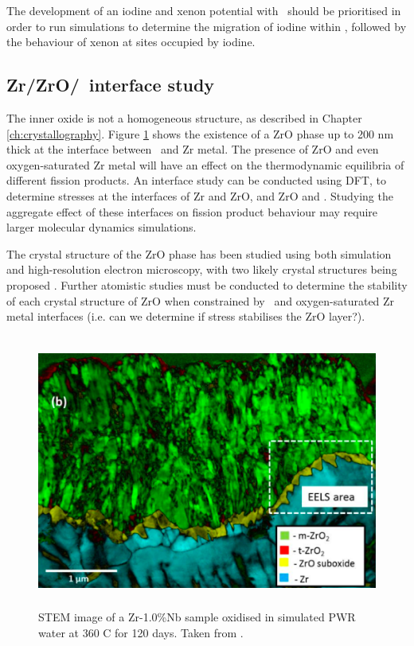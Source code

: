 The development of an iodine and xenon potential with \zirconia\ should be prioritised in order to run simulations to determine the migration of iodine within \zirconia, followed by the behaviour of xenon at sites occupied by iodine.

\subsection{Zr/ZrO/\zirconia\ interface study}

The inner oxide is not a homogeneous structure, as described in Chapter \ref{ch:crystallography}. Figure \ref{fig:zro_interface} shows the existence of a ZrO phase up to 200 nm thick at the interface between \zirconia\ and Zr metal. The presence of ZrO and even oxygen-saturated Zr metal will have an effect on the thermodynamic equilibria of different fission products. An interface study can be conducted using DFT, to determine stresses at the interfaces of Zr and ZrO, and ZrO and \zirconia . Studying the aggregate effect of these interfaces on fission product behaviour may require larger molecular dynamics simulations. 

The crystal structure of the ZrO phase has been studied using both simulation and high-resolution electron microscopy, with two likely crystal structures being proposed \cite{Nicholls2015}. Further atomistic studies must be conducted to determine the stability of each crystal structure of ZrO when constrained by \zirconia\ and oxygen-saturated Zr metal interfaces (i.e. can we determine if stress stabilises the ZrO layer?).

\begin{figure}[ht] %
    \centering
    \includegraphics[height=9cm]{images/zro_interface.png}
    \caption[STEM image of a Zr-1.0\%Nb sample oxidised in simulated PWR water at 360 \textdegree C for 120 days.]{STEM image of a Zr-1.0\%Nb sample oxidised in simulated PWR water at 360 \textdegree C for 120 days. Taken from \cite{inproceedings}.}
    \label{fig:zro_interface}
\end{figure}

